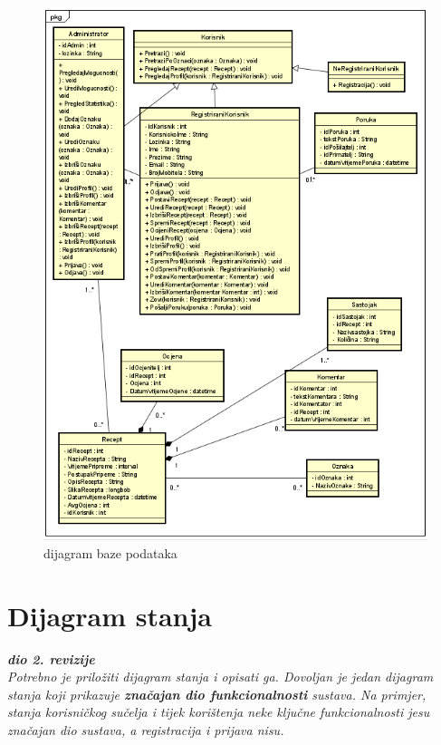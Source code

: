 		\begin{figure}[H]
			\includegraphics[scale=1.3]{slike/dijagram_razreda1.png} %
			\centering
			\caption{dijagram baze podataka}
			\label{fig:Dijagram_razreda1}
		\end{figure}
			
			
			\eject
		
		\section{Dijagram stanja}
			
			
			\textbf{\textit{dio 2. revizije}}\\
			
			\textit{Potrebno je priložiti dijagram stanja i opisati ga. Dovoljan je jedan dijagram stanja koji prikazuje \textbf{značajan dio funkcionalnosti} sustava. Na primjer, stanja korisničkog sučelja i tijek korištenja neke ključne funkcionalnosti jesu značajan dio sustava, a registracija i prijava nisu. }
			
